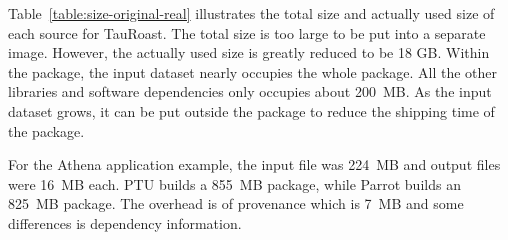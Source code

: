 Table~\ref{table:size-original-real} illustrates the total size and actually used size of each source for TauRoast. 
The total size is too large to be put into a separate image. However, the actually used size is greatly reduced to be 18 GB.
Within the package, the input dataset nearly occupies the whole package. All the other libraries and software dependencies only occupies about 200~MB.
As the input dataset grows, it can be put outside the package to reduce the shipping time of the package.

For the Athena application example, the input file was 224~MB and output files were 16~MB each. PTU builds a 855~MB package, while Parrot builds an 825~MB package. The overhead is of provenance which is 7~MB and some differences is dependency information. 
